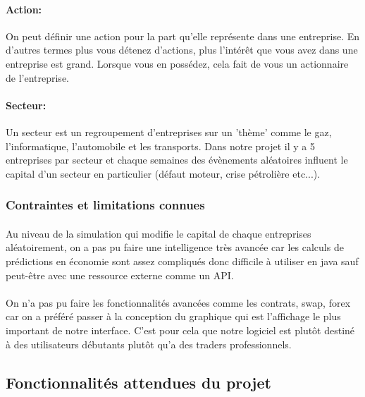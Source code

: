 \paragraph{Action:} On peut définir une action pour la part qu'elle représente dans une entreprise. En d'autres termes plus vous détenez d'actions, plus l'intérêt que vous avez dans une entreprise est grand. Lorsque vous en possédez, cela fait de vous un actionnaire de l'entreprise.
\paragraph{Secteur:} Un secteur est un regroupement d'entreprises sur un 'thème' comme le gaz,  l'informatique, l'automobile et les transports. Dans notre projet il y a 5 entreprises par secteur et chaque semaines des évènements aléatoires influent le capital d'un secteur en particulier (défaut moteur, crise pétrolière etc...).
\subsubsection{Contraintes et limitations connues}

\paragraph{} Au niveau de la simulation qui modifie le capital de chaque entreprises aléatoirement, on a pas pu faire une intelligence très avancée car les calculs de prédictions en économie sont assez compliqués donc difficile à utiliser en java sauf peut-être avec une ressource externe comme un API.
\paragraph{}On n’a pas pu faire les fonctionnalités avancées comme les contrats, swap, forex car on a préféré passer à la conception du graphique qui est l'affichage le plus important de notre interface. C'est pour cela que notre logiciel est plutôt destiné à des utilisateurs débutants plutôt qu'a des traders professionnels.

\subsection{Fonctionnalités attendues du projet}
\label{sec:spec2}

